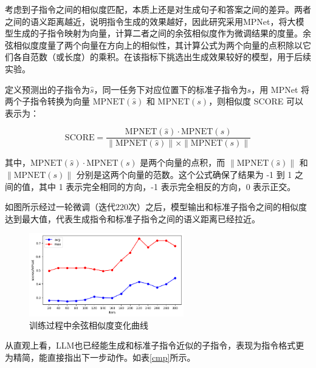 \documentclass[bachelor]{thesis-uestc}
\begin{document}
考虑到子指令之间的相似度匹配，本质上还是对生成句子和答案之间的差异。两者之间的语义距离越近，说明指令生成的效果越好，因此研究采用MPNet\cite{songMPNetMaskedPermuted2020}，将大模型生成的子指令映射为向量，计算二者之间的余弦相似度作为微调结果的度量。余弦相似度度量了两个向量在方向上的相似性，其计算公式为两个向量的点积除以它们各自范数（或长度）的乘积。在该指标下挑选出生成效果较好的模型，用于后续实验。

定义预测出的子指令为$\hat{s}$，同一任务下对应位置下的标准子指令为$s$，用 MPNet 将两个子指令转换为向量 \( \text{MPNET}(\hat{s}) \) 和 \( \text{MPNET}(s) \)，则相似度 SCORE 可以表示为：

\begin{equation}
    \text{SCORE} = \frac{\text{MPNET}(\hat{s}) \cdot \text{MPNET}(s)}{\|\text{MPNET}(\hat{s})\| \times \|\text{MPNET}(s)\|}
\label{mps}
\end{equation}

其中，\( \text{MPNET}(\hat{s}) \cdot \text{MPNET}(s) \) 是两个向量的点积，而 \( \|\text{MPNET}(\hat{s})\| \) 和 \( \|\text{MPNET}(s)\| \) 分别是这两个向量的范数。这个公式确保了结果为 -1 到 1 之间的值，其中 1 表示完全相同的方向，-1 表示完全相反的方向，0 表示正交。

如图所示经过一轮微调（迭代220次）之后，模型输出和标准子指令之间的相似度达到最大值，代表生成指令和标准子指令之间的语义距离已经拉近。

\begin {figure}[h]
\centering %
\includegraphics[width=0.6\textwidth]{4801-042816.png}
\caption{训练过程中余弦相似度变化曲线} %
\label{mpnet}
\end {figure}

从直观上看，LLM也已经能生成和标准子指令近似的子指令，表现为指令格式更为精简，能直接指出下一步动作。如表\ref{cmp}所示。
\end{document}
